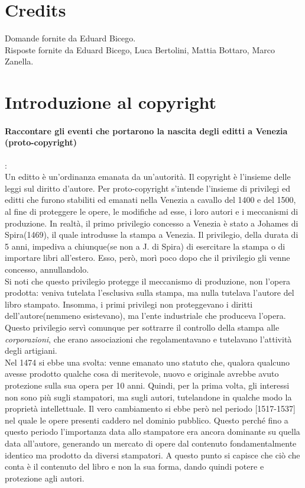\documentclass[a4paper]{article}
\begin{document}
	\section{Credits}
	Domande fornite da Eduard Bicego. \\
	Risposte fornite da Eduard Bicego, Luca Bertolini, Mattia Bottaro, Marco Zanella.
	
	\section{Introduzione al copyright}
	
		\paragraph{Raccontare gli eventi che portarono la nascita degli editti a Venezia (proto-copyright)}:\\
		Un editto è un'ordinanza emanata da un'autorità.
		Il copyright è l'insieme delle leggi sul diritto d'autore.
		Per proto-copyright s'intende l'insieme di privilegi ed editti che furono stabiliti ed emanati nella Venezia a cavallo del 1400 e del 1500, al fine di proteggere le opere, le modifiche ad esse, i loro autori e i meccanismi di produzione.
		In realtà, il primo privilegio concesso a Venezia è stato a Johames di Spira(1469), il quale introdusse la stampa a Venezia. Il privilegio, della durata di 5 anni, impediva a chiunque(se non a J. di Spira) di esercitare la stampa o di importare libri all'estero. Esso, però, morì poco dopo che il privilegio gli venne concesso, annullandolo. \\
		Si noti che questo privilegio protegge il meccanismo di produzione, non l'opera prodotta: veniva tutelata l'esclusiva sulla stampa, ma nulla tutelava l'autore del libro stampato.
		Insomma, i primi privilegi non proteggevano i diritti dell'autore(nemmeno esistevano), ma l'ente industriale che produceva l'opera.
		Questo privilegio servì comunque per sottrarre il controllo della stampa alle \textit{corporazioni}, che erano associazioni che regolamentavano e tutelavano l'attività degli artigiani.\\
		Nel 1474 si ebbe una svolta: venne emanato uno statuto che, qualora qualcuno avesse prodotto qualche cosa di meritevole, nuovo e originale avrebbe avuto protezione sulla sua opera per 10 anni. Quindi, per la prima volta, gli interessi non sono più sugli stampatori, ma sugli autori, tutelandone in qualche modo la proprietà intellettuale.
		Il vero cambiamento si ebbe però nel periodo [1517-1537] nel quale le opere presenti caddero nel dominio pubblico. Questo perché fino a questo periodo l'importanza data allo stampatore era ancora dominante su quella data all'autore, generando un mercato di opere dal contenuto fondamentalmente identico ma prodotto da diversi stampatori. A questo punto si capisce che ciò che conta è il contenuto del libro e non la sua forma, dando quindi potere e protezione agli autori.\\
\end{document}
